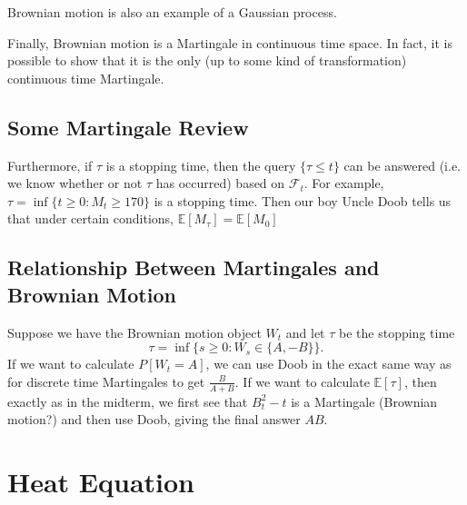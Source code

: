 Brownian motion is also an example of a Gaussian process.

Finally, Brownian motion is a Martingale in continuous time space. In fact, it is possible to show that it is the only (up to some kind of transformation) continuous time Martingale.

\subsection{Some Martingale Review}
 Furthermore, if $\tau$ is a stopping time, then the query $\{\tau\leq t\}$ can be answered (i.e. we know whether or not $\tau$ has occurred) based on $\mathcal F_t$. For example, $\tau=\inf\{t\geq 0:M_t\geq 170\}$ is a stopping time. Then our boy Uncle Doob tells us that under certain conditions, $\mathbb E[M_\tau] = \mathbb E[M_0]$

\subsection{Relationship Between Martingales and Brownian Motion}
Suppose we have the Brownian motion object $W_t$ and let $\tau$ be the stopping time $$ \tau=\inf\{s\geq 0:W_s\in\{A,-B\}\}. $$ If we want to calculate $P[W_t=A]$, we can use Doob in the exact same way as for discrete time Martingales to get $\frac{B}{A+B}$. If we want to calculate $\mathbb E[\tau]$, then exactly as in the midterm, we first see that $B_t^2-t$ is a Martingale (Brownian motion?) and then use Doob, giving the final answer $AB$.

\section{Heat Equation}

